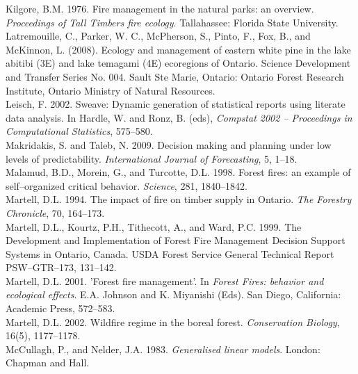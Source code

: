 \begin{spacing}{1.5}
\clearpage

\noindent Kilgore, B.M. 1976. Fire management in the natural parks: an overview. \emph{Proceedings of Tall Timbers fire ecology}. Tallahassee: Florida State University.\\

\noindent Latremouille, C., Parker, W. C., McPherson, S., Pinto, F., Fox, B., and McKinnon, L. (2008). Ecology and management of eastern white pine in the lake abitibi (3E) and lake temagami (4E) ecoregions of Ontario. Science Development and Transfer Series No. 004. Sault Ste Marie, Ontario: Ontario Forest Research Institute, Ontario Ministry of Natural Resources.\\

\noindent Leisch, F. 2002. Sweave: Dynamic generation of statistical reports using literate data analysis. In Hardle, W. and Ronz, B. (eds), \emph{Compstat 2002 -- Proceedings in Computational Statistics}, 575--580.\\

\noindent Makridakis, S. and Taleb, N. 2009. Decision making and planning under low levels of predictability. \emph{International Journal of Forecasting}, 5, 1--18.\\

\noindent Malamud, B.D., Morein, G., and Turcotte, D.L. 1998. Forest fires: an example of self--organized critical behavior. \emph{Science}, 281, 1840--1842.\\

\noindent Martell, D.L. 1994. The impact of fire on timber supply in Ontario. \emph{The Forestry Chronicle}, 70, 164--173.\\

\noindent Martell, D.L., Kourtz, P.H., Tithecott, A., and Ward, P.C. 1999. The Development and Implementation of Forest Fire Management Decision Support Systems in Ontario, Canada. USDA Forest Service General Technical Report PSW--GTR--173, 131--142.\\

\noindent Martell, D.L. 2001. 'Forest fire management'. In \emph{Forest Fires: behavior and ecological effects}. E.A. Johnson and K. Miyanishi (Eds). San Diego, California: Academic Press, 572--583.\\

\noindent Martell, D.L. 2002. Wildfire regime in the boreal forest. \emph{Conservation Biology}, 16(5), 1177--1178.\\

\noindent McCullagh, P., and Nelder, J.A. 1983.\emph{ Generalised linear models}. London: Chapman and Hall.\\


\end{spacing}
